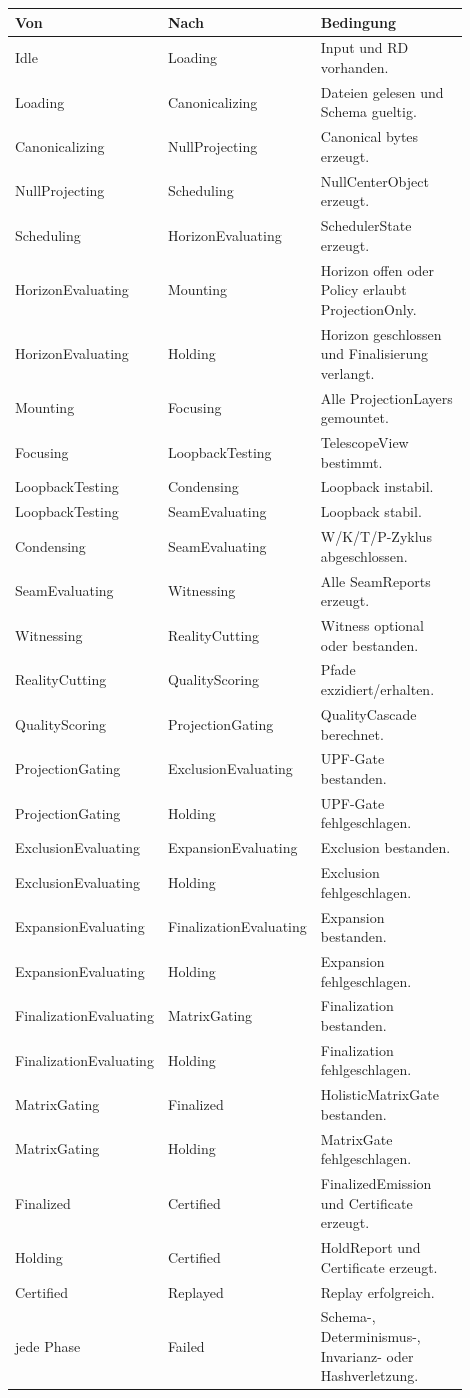 \documentclass[11pt,a4paper]{article}
\begin{document}
\begin{longtable}{p{0.22\linewidth}p{0.23\linewidth}p{0.45\linewidth}}
\toprule
Von & Nach & Bedingung \\
\midrule
\endhead
Idle & Loading & Input und RD vorhanden. \\
Loading & Canonicalizing & Dateien gelesen und Schema gueltig. \\
Canonicalizing & NullProjecting & Canonical bytes erzeugt. \\
NullProjecting & Scheduling & NullCenterObject erzeugt. \\
Scheduling & HorizonEvaluating & SchedulerState erzeugt. \\
HorizonEvaluating & Mounting & Horizon offen oder Policy erlaubt ProjectionOnly. \\
HorizonEvaluating & Holding & Horizon geschlossen und Finalisierung verlangt. \\
Mounting & Focusing & Alle ProjectionLayers gemountet. \\
Focusing & LoopbackTesting & TelescopeView bestimmt. \\
LoopbackTesting & Condensing & Loopback instabil. \\
LoopbackTesting & SeamEvaluating & Loopback stabil. \\
Condensing & SeamEvaluating & W/K/T/P-Zyklus abgeschlossen. \\
SeamEvaluating & Witnessing & Alle SeamReports erzeugt. \\
Witnessing & RealityCutting & Witness optional oder bestanden. \\
RealityCutting & QualityScoring & Pfade exzidiert/erhalten. \\
QualityScoring & ProjectionGating & QualityCascade berechnet. \\
ProjectionGating & ExclusionEvaluating & UPF-Gate bestanden. \\
ProjectionGating & Holding & UPF-Gate fehlgeschlagen. \\
ExclusionEvaluating & ExpansionEvaluating & Exclusion bestanden. \\
ExclusionEvaluating & Holding & Exclusion fehlgeschlagen. \\
ExpansionEvaluating & FinalizationEvaluating & Expansion bestanden. \\
ExpansionEvaluating & Holding & Expansion fehlgeschlagen. \\
FinalizationEvaluating & MatrixGating & Finalization bestanden. \\
FinalizationEvaluating & Holding & Finalization fehlgeschlagen. \\
MatrixGating & Finalized & HolisticMatrixGate bestanden. \\
MatrixGating & Holding & MatrixGate fehlgeschlagen. \\
Finalized & Certified & FinalizedEmission und Certificate erzeugt. \\
Holding & Certified & HoldReport und Certificate erzeugt. \\
Certified & Replayed & Replay erfolgreich. \\
jede Phase & Failed & Schema-, Determinismus-, Invarianz- oder Hashverletzung. \\
\bottomrule
\end{longtable}
\end{document}
